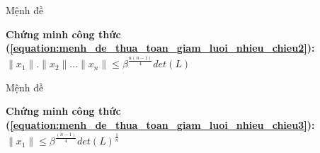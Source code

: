 \documentclass{beamer}
\numberwithin{equation}{section}
\begin{document}
\begin{frame}{Mệnh đề}

\textbf{Chứng minh công thức (\ref{equation:menh_de_thua_toan_giam_luoi_nhieu_chieu2}):}
$\|x_1\|.\|x_2\|\dots\|x_n\| \leq \beta^{\tfrac{n(n-1)}{4}}det(L) $


\end{frame}
\begin{frame}{Mệnh đề}

\textbf{Chứng minh công thức (\ref{equation:menh_de_thua_toan_giam_luoi_nhieu_chieu3}):}
$\|x_1\| \leq \beta^{\tfrac{(n-1)}{4}}det(L)^{\frac{1}{n}} $




\end{frame}
\end{document}
